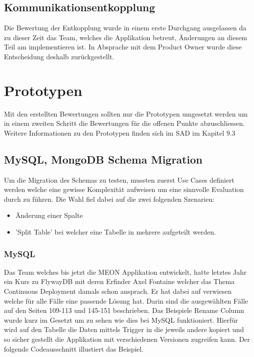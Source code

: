 \subsection{Kommunikationsentkopplung}

Die Bewertung der Entkopplung wurde in einem erste Durchgang ausgelassen da zu dieser Zeit das Team, welches die Applikation betreut, Änderungen an diesem Teil am implementieren ist. In Absprache mit dem Product Owner wurde diese Entscheidung deshalb zurückgestellt.

\section{Prototypen}

Mit den erstellten Bewertungen sollten nur die Prototypen umgesetzt werden um in einem zweiten Schritt die Bewertungen für die offenen Punkte abzuschliessen. Weitere Informationen zu den Prototypen finden sich im SAD im Kapitel 9.3

\subsection{MySQL, MongoDB Schema Migration}

Um die Migration des Schemas zu testen, mussten zuerst Use Cases definiert werden welche eine gewisse Komplexität aufweisen um eine sinnvolle Evaluation durch zu führen. Die Wahl fiel dabei auf die zwei folgenden Szenarien:
\begin{itemize}
	\item Änderung einer Spalte
	\item 'Split Table' bei welcher eine Tabelle in mehrere aufgeteilt werden.
\end{itemize}
\newpage
\subsubsection{MySQL}

Das Team welches bis jetzt die MEON Applikation entwickelt, hatte letztes Jahr ein Kurs zu FlywayDB mit deren Erfinder Axel Fontaine  welcher das Thema Continuous Deployment damals schon ansprach. Er hat dabei auf \cite{rd} verwiesen welche für alle Fälle eine passende Lösung hat. Darin sind die ausgewählten Fälle auf den Seiten 109-113 und 145-151 beschrieben. Das Beispiele Rename Column wurde kurz im Gesetzt um zu sehen wie dies bei MySQL funktioniert. Hierfür wird auf den Tabelle die Daten mittels Trigger in die jeweils andere kopiert und so sicher gestellt die Applikation mit verschiedenen Versionen zugreifen kann. Der folgende Codeausschnitt illustiert das Beispiel.


